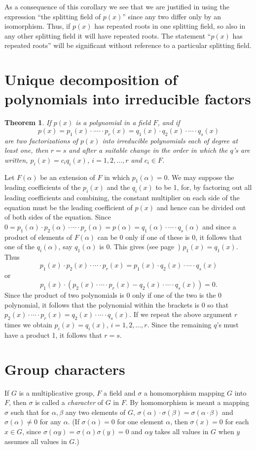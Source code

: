 \documentclass[10pt,leqno,a5paper]{book}
\newtheorem{theo}{Theorem}
\theoremstyle{definition}
\let\htw\section
\begin{document}
As a consequence of this corollary we see that we are justified in using the expression ``the splitting field of $p(x)$'' since any two differ only by an isomorphism.
Thus, if $p(x)$ has repeated roots in one splitting field, so also in any other splitting field it will have repeated roots.
The statement ``$p(x)$ has repeated roots'' will be significant without reference to a particular splitting field.



\htw{Unique decomposition of polynomials into irreducible factors}


\begin{theo}
\label{theo:onon}
If $p(x)$ is a polynomial in a field $F$, and if 
$$
p(x) = p_1(x) \cdot \cdot \cdots \cdot p_r(x) = q_1(x) \cdot q_2(x) \cdot \cdots \cdot q_s(x)
$$
are two factorizations of $p(x)$ into irreducible polynomials each of degree at least one, then $r = s$ and after a suitable change in the order in which the $q$'s are written, $p_i(x) = c_i q_i(x)$, $i = 1,2,\ldots,r$ and $c_i \in F$.
\end{theo}

Let $F(\alpha)$ be an extension of $F$ in which $p_1(\alpha) = 0$.
We may suppose the leading coefficients of the $p_i(x)$ and the $q_i(x)$ to be 1, for, by factoring out all leading coefficients and combining, the constant multiplier on each side of the equation must be the leading coefficient of $p(x)$ and hence can be divided out of both sides of the equation.
Since $0 = p_1(\alpha) \cdot p_2(\alpha) \cdot \cdots \cdot p_r(\alpha) = p(\alpha) = q_1(\alpha) \cdot \cdots \cdot q_s(\alpha)$ and since a product of elements of $F(\alpha)$ can be 0 only if one of these is 0, it follows that one of the $q_i(\alpha)$, say $q_1(\alpha)$ is 0.
This gives (see page~\pageref{p25}) $p_1(x) = q_1(x)$.
Thus 
$$
p_1(x) \cdot p_2(x) \cdot \cdots \cdot p_r(x) 
= p_1(x) \cdot q_2(x) \cdot \cdots \cdot q_s(x)
$$
or 
$$
p_1(x) \cdot (p_2(x) \cdot \cdots \cdot p_r(x) - q_2(x) \cdot \cdots \cdot q_s(x)) 
= 0.
$$
Since the product of two polynomials is $0$ only if one of the two is the $0$ polynomial, it follows that the polynomial within the brackets is 0 so that $p_2(x) \cdot \cdots \cdot p_r(x) = q_2(x) \cdot \cdots \cdot q_s(x)$.
If we repeat the above argument $r$ times we obtain $p_i(x) = q_i(x)$, $i = 1,2,\ldots, r$.
Since the remaining $q$'s must have a product 1, it follows that $r = s$.


\htw{Group characters}

If $G$ is a multiplicative group, $F$ a field and $\sigma$ a homomorphism mapping $G$ into $F$, then $\sigma$ is called a \emph{character} of $G$ in $F$.
By homomorphism is meant a mapping $\sigma$ such that for $\alpha, \beta$ any two elements of $G$, $\sigma(\alpha) \cdot \sigma(\beta) = \sigma(\alpha \cdot \beta)$ and $\sigma(\alpha) \not= 0$ for any $\alpha$.
(If $\sigma(\alpha) = 0$ for one element $\alpha$, then $\sigma(x) = 0$ for each $x \in G$, since $\sigma(\alpha y) = \sigma(\alpha) \sigma(y) = 0$ and $\alpha y$ takes all values in $G$ when $y$ assumes all values in $G$.)
\end{document}
